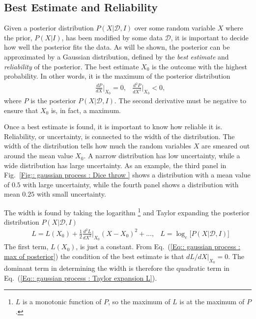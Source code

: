 \documentclass[twoside,english]{uiofysmaster}
\begin{document}
\subsection{Best Estimate and Reliability}\label{Sec:: gaussian process : Best estimate}

Given a posterior distribution $P(X| \mathcal{D}, I)$ over some random variable $X$ where the prior, $P(X|I)$, has been modified by some data $\mathcal{D}$, it is important to decide how well the posterior fits the data. As will be shown, the posterior can be approximated by a Gaussian distribution, defined by the \textit{best estimate} and \textit{reliability} of the posterior. The best estimate $X_0$  is the outcome with the highest probability. In other words, it is the maximum of the posterior distribution
\begin{align}\label{Eq:: gaussian process : max of posterior}
&\frac{dP}{dX}\Big|_{X_0} = 0, &\frac{d^2P}{dX^2}\Big|_{X_0} < 0,
\end{align}
where $P$ is the posterior $P(X| \mathcal{D}, I)$. The second derivative must be negative to ensure that $X_0$ is, in fact, a maximum. 

Once a best estimate is found, it is important to know how reliable it is. Reliability, or uncertainty, is connected to the width of the distribution. The width of the distribution tells how much the random variables $X$ are smeared out around the mean value $X_0$. A narrow distribution has low uncertainty, while a wide distribution has large uncertainty. As an example, the third panel in Fig.~\ref{Fig:: gaussian process : Dice throw } shows a distribution with a mean value of $0.5$ with large uncertainty, while the fourth panel shows a distribution with mean $0.25$ with small uncertainty. 

The width is found by taking the logarithm \footnote{$L$ is a monotonic function of $P$, so the maximum of $L$ is at the maximum of $P$.} and Taylor expanding the posterior distribution $P(X| \mathcal{D}, I)$
\begin{align}
&L = L(X_0) + \frac{1}{2} \frac{d^2L}{dX^2}\Big|_{X_0} (X-X_0)^2 +... ,&L = \log_e \Big[P(X | \mathcal{D}, I ) \Big]\label{Eq:: gaussian process : Taylor expansion L}
\end{align}
The first term, $L(X_0)$, is just a constant. From Eq.~(\ref{Eq:: gaussian process : max of posterior}) the condition of the best estimate is that $dL/dX|_{X_0} =0$. The dominant term in determining the width is therefore the quadratic term in Eq.~(\ref{Eq:: gaussian process : Taylor expansion L}).
\end{document}
